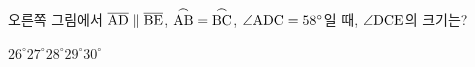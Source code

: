 \noindent\begin{minipage}[t]{0.58\linewidth}\vspace{0pt}\raggedright 오른쪽 그림에서 $\overline{\mathrm{AD}}\parallel\overline{\mathrm{BE}}$, $\overset{\frown}{\mathrm{AB}}=\overset{\frown}{\mathrm{BC}}$, $\angle\mathrm{ADC}=58^\circ$일 때, $\angle\mathrm{DCE}$의 크기는?\end{minipage}\hfill\begin{minipage}[t]{0.4\linewidth}\vspace{0pt}\centering \resizebox{\ifdim\width>\linewidth\linewidth\else\width\fi}{!}{}\end{minipage}\par
\begin{choicesii}{$26^\circ$}{$27^\circ$}{$28^\circ$}{$29^\circ$}{$30^\circ$}\end{choicesii}
